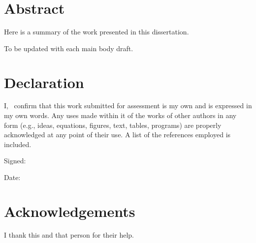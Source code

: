 \thispagestyle{plain}

\section*{Abstract} %
Here is a summary of the work presented in this dissertation.

To be updated with each main body draft.

\section*{Declaration}
I, \docAuthor\ confirm that this work submitted for assessment is my own and is expressed in my own words. Any uses made within it of the works of other authors in any form (e.g., ideas, equations, figures, text, tables, programs) are properly acknowledged at any point of their use. A list of the references employed is included.

Signed:

Date:

\section*{Acknowledgements}
I thank this and that person for their help.

